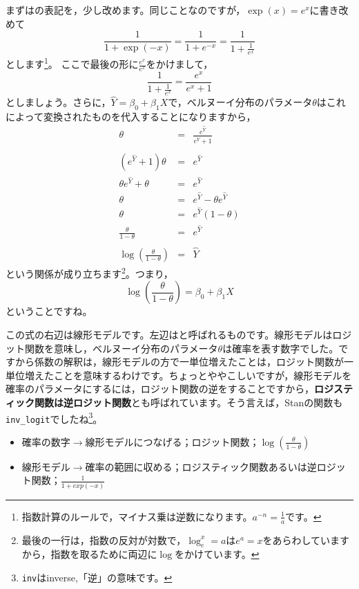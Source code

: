 \documentclass{ltjsbook}
\begin{document}
まずはの表記を，少し改めます。同じことなのですが，$\exp(x) = e^x$に書き改めて
\[ \frac{1}{1+\exp(-x)} = \frac{1}{1+e^{-x}} = \frac{1}{1+\frac{1}{e^x}} \]
とします\footnote{指数計算のルールで，マイナス乗は逆数になります。$a^{-n}=\frac{1}{a}$です。}。
ここで最後の形に$\frac{e^x}{e^x}$をかけまして，
\[ \frac{1}{1+\frac{1}{e^x}}=\frac{e^x}{e^x+1} \]
としましょう。さらに，$\hat{Y} = \beta_0 + \beta_1 X$で，ベルヌーイ分布のパラメータ$\theta$はこれによって変換されたものを代入することになりますから，
\begin{eqnarray*}
  \theta &=& \frac{e^{\hat{Y}}}{e^{\hat{Y}}+1} \\
  &&\\
  (e^{\hat{Y}}+1)\theta & = & e^{\hat{Y}} \\
  \theta e^{\hat{Y}} + \theta &=& e^{\hat{Y}} \\
  \theta & = & e^{\hat{Y}} - \theta e^{\hat{Y}} \\
  \theta & = & e^{\hat{Y}}(1-\theta) \\
  \frac{\theta}{1-\theta} &=& e^{\hat{Y}}\\
  &&\\
  \log\left(\frac{\theta}{1-\theta}\right) &=& \hat{Y}
\end{eqnarray*}
という関係が成り立ちます\footnote{最後の一行は，指数の反対が対数で，$\log_e^x=a$は$e^a=x$をあらわしていますから，指数を取るために両辺に$\log$をかけています。}。つまり，
\[ \log\left(\frac{\theta}{1-\theta}\right) =  \beta_0 + \beta_1 X \]
ということですね。

この式の右辺は線形モデルです。左辺はと呼ばれるものです。線形モデルはロジット関数を意味し，ベルヌーイ分布のパラメータ$\theta$は確率を表す数字でした。ですから係数の解釈は，線形モデルの方で一単位増えたことは，ロジット関数が一単位増えたことを意味するわけです。ちょっとややこしいですが，線形モデルを確率のパラメータにするには，ロジット関数の逆をすることですから，\textbf{ロジスティック関数は逆ロジット関数}とも呼ばれています。そう言えば，Stanの関数も\verb|inv_logit|でしたね\footnote{\texttt{inv}はinverse,「逆」の意味です。}。
\begin{itemize}
  \item 確率の数字$\to$線形モデルにつなげる；ロジット関数；$\log \left( \frac{\theta}{1-\theta} \right) $
  \item 線形モデル$\to$確率の範囲に収める；ロジスティック関数あるいは逆ロジット関数；$\frac{1}{1+exp(-x)}$
\end{itemize}
\end{document}
